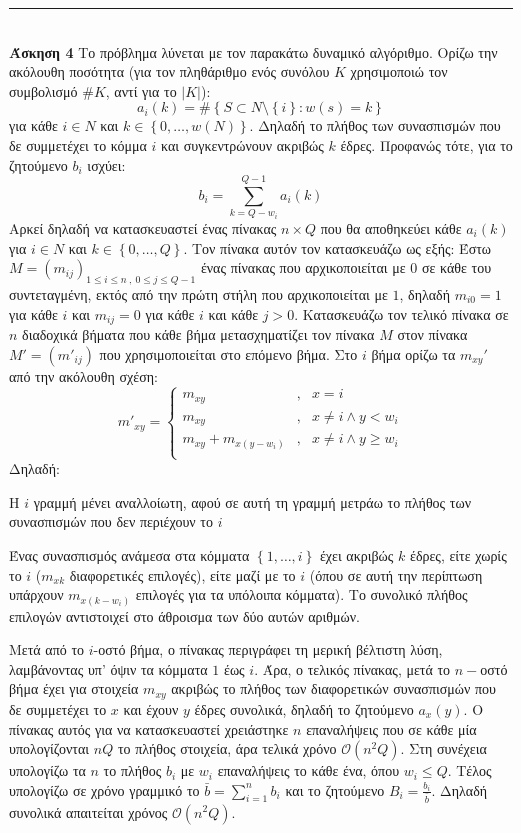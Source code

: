 \documentclass[12pt]{article}
\newcommand\bigOh{\mathcal{O}}
\newenvironment{b_item}{
\begin{itemize}
  \setlength{\itemsep}{0pt}
  \setlength{\parskip}{0pt}
  \setlength{\parsep}{0pt}
}{\end{itemize}}
\newcommand{\HRule}{\rule{\linewidth}{0.1mm}}
\begin{document}
\HRule\\
{\bf Άσκηση 4} Το πρόβλημα λύνεται με τον παρακάτω δυναμικό αλγόριθμο. Ορίζω την ακόλουθη ποσότητα (για τον πληθάριθμο ενός συνόλου $K$ χρησιμοποιώ τον συμβολισμό $\# K$, αντί για το $\left|K\right|$):
$$a_i\left(k\right)=\#\left\{S\subset N\setminus\left\{i\right\}:w\left(s\right)=k\right\}$$
για κάθε $i\in N$ και $k\in\left\{0,\ldots,w\left(N\right)\right\}$. Δηλαδή το πλήθος των συνασπισμών που δε συμμετέχει το κόμμα $i$ και συγκεντρώνουν ακριβώς $k$ έδρες. Προφανώς τότε, για το ζητούμενο $b_i$ ισχύει:
$$b_i=\sum_{k=Q-w_i}^{Q-1}a_i\left(k\right)$$
Αρκεί δηλαδή να κατασκευαστεί ένας πίνακας $n\times Q$ που θα αποθηκεύει κάθε $a_i\left(k\right)$ για $i\in N$ και $k\in\left\{0,\ldots,Q\right\}$. Τον πίνακα αυτόν τον κατασκευάζω ως εξής:
Έστω $M=\left(m_{ij}\right)_{1\leq i\leq n\ ,\ 0\leq j\leq Q-1}$ ένας πίνακας που αρχικοποιείται με $0$ σε κάθε του συντεταγμένη, εκτός από την πρώτη στήλη που αρχικοποιείται με $1$, δηλαδή $m_{i0}=1$ για κάθε $i$ και $m_{ij}=0$ για κάθε $i$ και κάθε $j>0$. Κατασκευάζω τον τελικό πίνακα σε $n$ διαδοχικά βήματα που κάθε βήμα μετασχηματίζει τον πίνακα $M$ στον πίνακα $M'=\left(m'_{ij}\right)$ που χρησιμοποιείται στο επόμενο βήμα. Στο $i$ βήμα ορίζω τα $m_{xy}'$ από την ακόλουθη σχέση:
$$m'_{xy}=\left\{\begin{array}{lcl}
m_{xy}&,&x=i\\
m_{xy}&,&x\neq i\land y<w_i\\
m_{xy}+m_{x\left(y-w_i\right)}&,&x\neq i\land y\geq w_i\\
\end{array}\right.$$
Δηλαδή:
\begin{b_item}
\item Η $i$ γραμμή μένει αναλλοίωτη, αφού σε αυτή τη γραμμή μετράω το πλήθος των συνασπισμών που δεν περιέχουν το $i$
\item Ένας συνασπισμός ανάμεσα στα κόμματα $\left\{1,\ldots,i\right\}$ έχει ακριβώς $k$ έδρες, είτε χωρίς το $i$ ($m_{xk}$ διαφορετικές επιλογές), είτε μαζί με το $i$ (όπου σε αυτή την περίπτωση υπάρχουν $m_{x\left(k-w_i\right)}$ επιλογές για τα υπόλοιπα κόμματα). Το συνολικό πλήθος επιλογών αντιστοιχεί στο άθροισμα των δύο αυτών αριθμών.
\end{b_item}
Μετά από το $i$-οστό βήμα, ο πίνακας περιγράφει τη μερική βέλτιστη λύση, λαμβάνοντας υπ' όψιν τα κόμματα $1$ έως $i$. Άρα, ο τελικός πίνακας, μετά το $n-$οστό βήμα έχει για στοιχεία $m_{xy}$ ακριβώς το πλήθος των διαφορετικών συνασπισμών που δε συμμετέχει το $x$ και έχουν $y$ έδρες συνολικά, δηλαδή το ζητούμενο $a_x\left(y\right)$. Ο πίνακας αυτός για να κατασκευαστεί χρειάστηκε $n$ επαναλήψεις που σε κάθε μία υπολογίζονται $nQ$ το πλήθος στοιχεία, άρα τελικά χρόνο $\bigOh\left(n^2Q\right)$. Στη συνέχεια υπολογίζω τα $n$ το πλήθος $b_i$ με $w_i$ επαναλήψεις το κάθε ένα, όπου $w_i\leq Q$. Τέλος υπολογίζω σε χρόνο γραμμικό το $\bar{b}=\sum_{i=1}^nb_i$ και το ζητούμενο $B_i=\frac{b_i}{\bar{b}}$. Δηλαδή συνολικά απαιτείται χρόνος $\bigOh\left(n^2Q\right)$.\\
\end{document}
